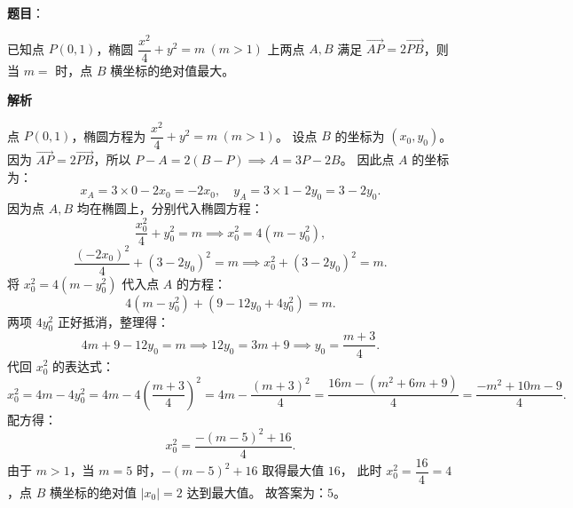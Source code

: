 \begin{answer}

\textbf{题目}：

已知点 $P(0, 1)$，椭圆 $\dfrac{x^2}{4} + y^2 = m\ (m > 1)$ 上两点 $A, B$ 满足 $\overrightarrow{AP} = 2\overrightarrow{PB}$，则当 $m =$ \underline{\hspace{2cm}} 时，点 $B$ 横坐标的绝对值最大。

\textbf{解析}

点 $P(0, 1)$，椭圆方程为 $\dfrac{x^2}{4} + y^2 = m\ (m > 1)$。
设点 $B$ 的坐标为 $(x_0, y_0)$。
因为 $\overrightarrow{AP} = 2\overrightarrow{PB}$，所以 $P - A = 2(B - P) \implies A = 3P - 2B$。
因此点 $A$ 的坐标为：
\nopagebreak[4]
\[x_A = 3 \times 0 - 2x_0 = -2x_0,\quad y_A = 3 \times 1 - 2y_0 = 3 - 2y_0.\]
因为点 $A, B$ 均在椭圆上，分别代入椭圆方程：
\nopagebreak[4]
\[\dfrac{x_0^2}{4} + y_0^2 = m \implies x_0^2 = 4(m - y_0^2),\]
\nopagebreak[4]
\[\dfrac{(-2x_0)^2}{4} + (3 - 2y_0)^2 = m \implies x_0^2 + (3 - 2y_0)^2 = m.\]
将 $x_0^2 = 4(m - y_0^2)$ 代入点 $A$ 的方程：
\nopagebreak[4]
\[4(m - y_0^2) + (9 - 12y_0 + 4y_0^2) = m.\]
两项 $4y_0^2$ 正好抵消，整理得：
\nopagebreak[4]
\[4m + 9 - 12y_0 = m \implies 12y_0 = 3m + 9 \implies y_0 = \dfrac{m + 3}{4}.\]
代回 $x_0^2$ 的表达式：
\nopagebreak[4]
\[x_0^2 = 4m - 4y_0^2 = 4m - 4\left(\dfrac{m + 3}{4}\right)^2 = 4m - \dfrac{(m + 3)^2}{4} = \dfrac{16m - (m^2 + 6m + 9)}{4} = \dfrac{-m^2 + 10m - 9}{4}.\]
配方得：
\nopagebreak[4]
\[x_0^2 = \dfrac{-(m - 5)^2 + 16}{4}.\]
由于 $m > 1$，当 $m = 5$ 时，$-(m - 5)^2 + 16$ 取得最大值 $16$，
此时 $x_0^2 = \dfrac{16}{4} = 4$，点 $B$ 横坐标的绝对值 $|x_0| = 2$ 达到最大值。
故答案为：$5$。


\par\medskip

\end{answer}

